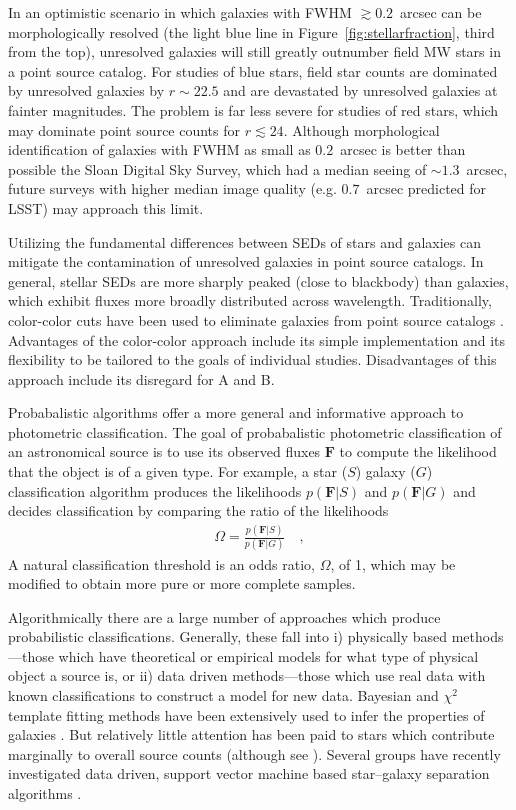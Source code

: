 \documentclass[12pt,preprint]{aastex}
\newcommand{\datavector}[1]{\boldsymbol{#1}}
\begin{document}
In an optimistic scenario in which galaxies with FWHM $\gtrsim 0.2$~arcsec can
be morphologically resolved (the light blue line in
Figure~\ref{fig:stellarfraction}, third from the top), unresolved
galaxies will still greatly outnumber field MW stars in a point source
catalog.  For studies of blue stars, field star counts are dominated
by unresolved galaxies by $r\sim22.5$ and are devastated by unresolved
galaxies at fainter magnitudes. The problem is far less severe for
studies of red stars, which may dominate point source counts for
$r\lesssim24$. Although morphological identification of galaxies with
FWHM as small as $0.2$~arcsec is better than possible the Sloan Digital Sky
Survey, which had a median seeing of $\sim1.3$~arcsec, future surveys with
higher median image quality (e.g. $0.7$~arcsec predicted for LSST) may
approach this limit.

Utilizing the fundamental differences between SEDs of stars and
galaxies can mitigate the contamination of unresolved galaxies in
point source catalogs.  In general, stellar SEDs are more sharply
peaked (close to blackbody) than galaxies, which exhibit fluxes more
broadly distributed across wavelength.  Traditionally, color-color
cuts have been used to eliminate galaxies from point source catalogs
\citep[e.g.][]{gould92a,reitzel98a,daddi04a}.  Advantages of the
color-color approach include its simple implementation and its
flexibility to be tailored to the goals of individual studies.
Disadvantages of this approach include its disregard for A and B.

Probabalistic algorithms offer a more general and informative approach
to photometric classification.  The goal of probabalistic photometric
classification of an astronomical source is to use its observed fluxes
$\datavector{F}$ to compute the likelihood that the object is of a
given type.  For example, a star ($S$) galaxy ($G$) classification
algorithm produces the likelihoods $p(\datavector{F}|S)$ and
$p(\datavector{F}|G)$ and decides classification by comparing the
ratio of the likelihoods
\begin{eqnarray}\displaystyle
\Omega = \frac{p(\datavector{F}|S)}{p(\datavector{F}|G)} 
\quad ,
\label{eqn:oddsratio}
\end{eqnarray}
A natural classification threshold is an odds ratio,
$\Omega$, of 1, which may be modified to obtain more pure or more
complete samples.

Algorithmically there are a large number of approaches which produce
probabilistic classifications.  Generally, these fall into i)
physically based methods---those which have theoretical or empirical
models for what type of physical object a source is, or ii) data
driven methods---those which use real data with known classifications
to construct a model for new data.  Bayesian and $\chi^2$ template
fitting methods have been extensively used to infer the properties of
galaxies \citep[e.g.][]{coil04a, ilbert09, xia09,
  walcher11a,hildebrandt10}. But relatively little attention has been
paid to stars which contribute marginally to overall source counts
(although see \citealt{robin07}).  Several groups have recently
investigated data driven, support vector machine based star--galaxy
separation algorithms \citep[e.g.][]{saglia12,solarz12a,tsalmantza12a}.
\end{document}
